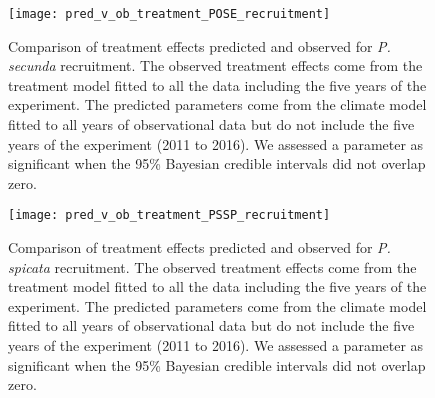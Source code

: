 \documentclass[11pt]{article}
\begin{document}
\begin{figure}[!htbp]
	\centering
	\texttt{[image: pred\_v\_ob\_treatment\_POSE\_recruitment]}
	\caption{Comparison of treatment effects predicted and observed for \textit{P. secunda} recruitment. The observed treatment effects come from the treatment model fitted to all the data including the five years of the experiment.  The predicted parameters come from the climate model fitted to all years of observational data but do not include the five years of the experiment (2011 to 2016). We assessed a parameter as significant when the 95\% Bayesian credible intervals did not overlap zero.}
	\label{fig:parPredPOSERecruitment}
\end{figure}

\begin{figure}[!htbp]
	\centering
	\texttt{[image: pred\_v\_ob\_treatment\_PSSP\_recruitment]}
	\caption{Comparison of treatment effects predicted and observed for \textit{P. spicata} recruitment.  The observed treatment effects come from the treatment model fitted to all the data including the five years of the experiment.  The predicted parameters come from the climate model fitted to all years of observational data but do not include the five years of the experiment (2011 to 2016). We assessed a parameter as significant when the 95\% Bayesian credible intervals did not overlap zero.}
	\label{fig:parPredPSSPRecruitment}
\end{figure}
\end{document}

